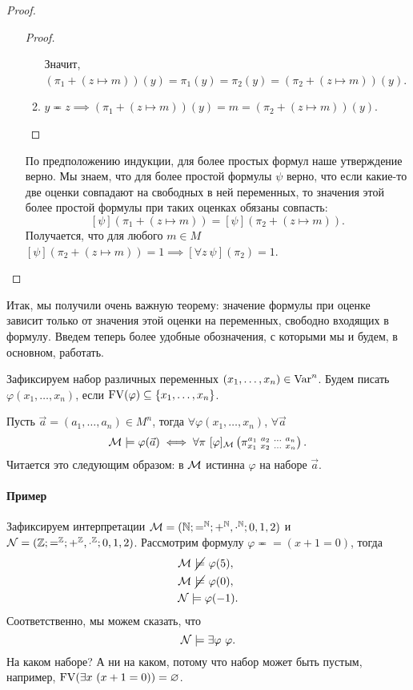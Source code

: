 \begin{proof}
\begin{enumerate}
\begin{proof}
\begin{enumerate}
                Значит, $(\pi_{1} + (z \mapsto m))(y) = \pi_{1}(y) = \pi_{2}(y) = (\pi_{2} + (z \mapsto m))(y)$.
                \item $y \eqcirc z \implies (\pi_{1} + (z \mapsto m))(y) = m = (\pi_{2} + (z \mapsto m))(y)$. \qedhere
            \end{enumerate}
        \end{proof}
        По предположению индукции, для более простых формул наше утверждение верно.
        Мы знаем, что для более простой формулы $\psi$ верно, что если какие-то две оценки совпадают на свободных в ней переменных, то значения этой более простой формулы при таких оценках обязаны совпасть:
        $$
            [\psi](\pi_{1} + (z \mapsto m)) = [\psi](\pi_{2} + (z \mapsto m)).
        $$
        Получается, что для любого $m \in M$ $[\psi](\pi_{2} + (z \mapsto m)) = 1 \implies [\forall z~\psi](\pi_{2}) = 1$. \qedhere
    \end{enumerate}
\end{proof}

Итак, мы получили очень важную теорему: значение формулы при оценке зависит только от значения этой оценки на переменных, свободно входящих в формулу.
Введем теперь более удобные обозначения, с которыми мы и будем, в основном, работать.

\begin{notation*}
    Зафиксируем набор различных переменных $(x_{1}, \ldots, x_{n}) \in \mathrm{Var}^{n}$.
    Будем писать $\varphi(x_{1}, \ldots, x_{n})$, если $\mathrm{FV}(\varphi) \subseteq \{x_{1}, \ldots, x_{n}\}$.
\end{notation*}

\begin{notation*}
    Пусть $\vec{a} = (a_{1}, \ldots, a_{n}) \in M^{n}$, тогда $\forall \varphi(x_{1}, \ldots, x_{n})$, $\forall \vec{a}$
    $$
        \mathcal{M} \models \varphi(\vec{a}) \iff \forall\pi~[\varphi]_{\mathcal{M}}\left(\pi_{x_{1}~x_{2}~\ldots~x_{n}}^{a_{1}~a_{2}~\ldots~a_{n}}\right).
    $$
    Читается это следующим образом: в $\mathcal{M}$ истинна $\varphi$ на наборе $\vec{a}$.
\end{notation*}

\paragraph{Пример}
Зафиксируем интерпретации $\mathcal{M} = (\mathbb{N}; =^{\mathbb{N}}; +^{\mathbb{N}}, \cdot^{\mathbb{N}}; 0, 1, 2)$ и $\mathcal{N} = (\mathbb{Z}; =^{\mathbb{Z}}; +^{\mathbb{Z}}, \cdot^{\mathbb{Z}}; 0, 1, 2)$.
Рассмотрим формулу $\varphi \eqcirc = (x + 1 = 0)$, тогда
\begin{align}
    &\mathcal{M} ~\cancel{\models}~ \varphi(5), \\
    &\mathcal{M} ~\cancel{\models}~ \varphi(0), \\
    &\mathcal{N} \models \varphi(-1).
\end{align}
Соответственно, мы можем сказать, что
$$
    \mathcal{N} \models \exists \varphi~\varphi.
$$
На каком наборе?
А ни на каком, потому что набор может быть пустым, например, $\mathrm{FV}(\exists x~ (x + 1 = 0)) = \varnothing$.

